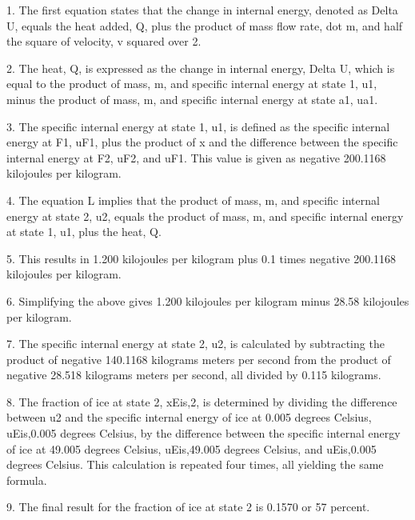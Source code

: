 1. The first equation states that the change in internal energy, denoted as Delta U, equals the heat added, Q, plus the product of mass flow rate, dot m, and half the square of velocity, v squared over 2.

2. The heat, Q, is expressed as the change in internal energy, Delta U, which is equal to the product of mass, m, and specific internal energy at state 1, u1, minus the product of mass, m, and specific internal energy at state a1, ua1.

3. The specific internal energy at state 1, u1, is defined as the specific internal energy at F1, uF1, plus the product of x and the difference between the specific internal energy at F2, uF2, and uF1. This value is given as negative 200.1168 kilojoules per kilogram.

4. The equation L implies that the product of mass, m, and specific internal energy at state 2, u2, equals the product of mass, m, and specific internal energy at state 1, u1, plus the heat, Q.

5. This results in 1.200 kilojoules per kilogram plus 0.1 times negative 200.1168 kilojoules per kilogram.

6. Simplifying the above gives 1.200 kilojoules per kilogram minus 28.58 kilojoules per kilogram.

7. The specific internal energy at state 2, u2, is calculated by subtracting the product of negative 140.1168 kilograms meters per second from the product of negative 28.518 kilograms meters per second, all divided by 0.115 kilograms.

8. The fraction of ice at state 2, xEis,2, is determined by dividing the difference between u2 and the specific internal energy of ice at 0.005 degrees Celsius, uEis,0.005 degrees Celsius, by the difference between the specific internal energy of ice at 49.005 degrees Celsius, uEis,49.005 degrees Celsius, and uEis,0.005 degrees Celsius. This calculation is repeated four times, all yielding the same formula.

9. The final result for the fraction of ice at state 2 is 0.1570 or 57 percent.